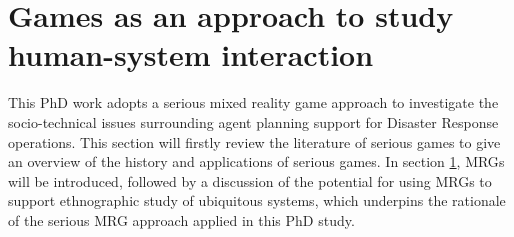 \section{Games as an approach to study human-system interaction } \label{sec:LRMRgame}
This PhD work adopts a serious mixed reality game approach to investigate the socio-technical issues surrounding agent planning support for Disaster Response operations. This section will firstly review the literature of serious games to give an overview of the history and applications of serious games. In section \ref{sec:LRMRgame}, \acf{MRG}s will be introduced, followed by a discussion of the potential for using \ac{MRG}s to support ethnographic study of ubiquitous systems, which underpins the rationale of the serious \ac{MRG} approach applied in this PhD study.\\ 



